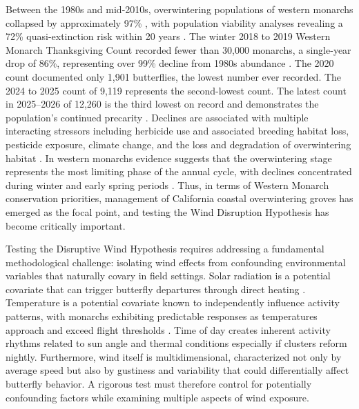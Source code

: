 \documentclass[insects,article,submit,pdftex,moreauthors]{Definitions/mdpi}
\begin{document}
Between the 1980s and mid-2010s, overwintering populations of western monarchs collapsed by approximately 97\% \cite{schultzCitizenScienceMonitoring2017}, with population viability analyses revealing a 72\% quasi-extinction risk within 20 years \cite{schultzCitizenScienceMonitoring2017}. The winter 2018 to 2019 Western Monarch Thanksgiving Count recorded fewer than 30,000 monarchs, a single-year drop of 86\%, representing over 99\% decline from 1980s abundance \cite{peltonWesternMonarchPopulation2019}. The 2020 count documented only 1,901 butterflies, the lowest number ever recorded. The 2024 to 2025 count of 9,119 represents the second-lowest count. The latest count in 2025--2026 of 12,260 is the third lowest on record and demonstrates the population's continued precarity \cite{xercessocietyWesternMonarchButterfly2025}. Declines are associated with multiple interacting stressors including herbicide use and associated breeding habitat loss, pesticide exposure, climate change, and the loss and degradation of overwintering habitat \cite{croneWhyAreMonarch2019,peltonWesternMonarchPopulation2019,oberhauser2026MonarchConservation}. In western monarchs evidence suggests that the overwintering stage represents the most limiting phase of the annual cycle, with declines concentrated during winter and early spring periods \cite{peltonWesternMonarchPopulation2019,mariniDensitydependenceDecliningPopulation2017}. Thus, in terms of Western Monarch conservation priorities, management of California coastal overwintering groves has emerged as the focal point, and testing the Wind Disruption Hypothesis has become critically important.

Testing the Disruptive Wind Hypothesis requires addressing a fundamental methodological challenge: isolating wind effects from confounding environmental variables that naturally covary in field settings. Solar radiation is a potential covariate that can trigger butterfly departures through direct heating \cite{mastersMonarchButterflyDanaus1988,kammerThoracicTemperatureShivering1970}. Temperature is a potential covariate known to independently influence activity patterns, with monarchs exhibiting predictable responses as temperatures approach and exceed flight thresholds \cite{barkerEffectPhotoperiodTemperature1976}. Time of day creates inherent activity rhythms related to sun angle and thermal conditions \cite{mouritsenVirtualMigrationTethered2002} especially if clusters reform nightly. Furthermore, wind itself is multidimensional, characterized not only by average speed but also by gustiness and variability \cite{nathanLongdistanceBiologicalTransport2005} that could differentially affect butterfly behavior. A rigorous test must therefore control for potentially confounding factors while examining multiple aspects of wind exposure.
\end{document}
